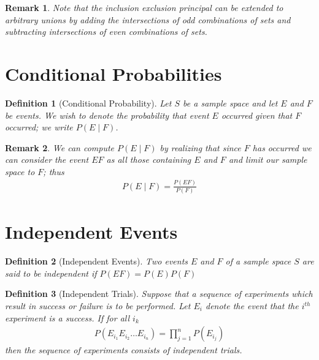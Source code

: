 \documentclass[11pt, oneside]{book}   	%
\newtheorem{definition}{Definition}[chapter]
\newtheorem{remark}{Remark}[chapter]
\begin{document}
\begin{spacing}{1.618}
\begin{remark}
	Note that the inclusion exclusion principal can be extended to arbitrary unions by adding the intersections of odd combinations of sets and subtracting intersections of even combinations of sets. 
\end{remark}

\section{Conditional Probabilities}
\begin{definition}[Conditional Probability]
	Let $S$ be a sample space and let $E$ and $F$ be events. We wish to denote the probability that event $E$ occurred given that $F$ occurred; we write $P(E\mid F)$.
\end{definition}

\begin{remark}
	We can compute $P(E\mid F)$ by realizing that since $F$ has occurred we can consider the event $EF$ as all those containing $E$ and $F$ and limit our sample space to $F$; thus
	\begin{alignat}{4}
		P(E\mid F)=\frac{P(EF)}{P(F)}
	\end{alignat} 
\end{remark}

\section{Independent Events}

\begin{definition}[Independent Events]
	Two events $E$ and $F$ of a sample space $S$ are said to be independent if $P(EF)=P(E)P(F)$
\end{definition}

\begin{definition}[Independent Trials]
	Suppose that a sequence of experiments which result in success or failure is to be performed. Let $E_i$ denote the event that the $i^{th}$ experiment is a success. If for all $i_k$
	\begin{alignat}{4}
		P(E_{i_1}E_{i_2}\dots E_{i_n})=\prod_{j=1}^nP(E_{i_j}) 
	\end{alignat}
	then the sequence of experiments consists of independent trials. 
\end{definition}


\end{spacing}
\end{document}
